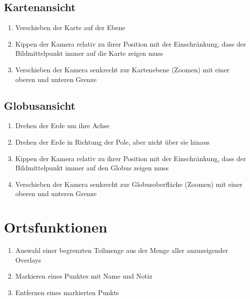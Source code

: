 \documentclass[10pt]{scrreprt}
\newcommand{\ziel}[1]{{\fontsize{9.5}{11}\textsf{/#1/}}}
\newcommand{\ziellabel}{Z}
\newcommand{\muss}{\renewcommand{\labelenumi}{\textbf{\ziel{\ziellabel\numprint{\theenumi}0}}}}
\newcommand{\wunsch}{\renewcommand{\labelenumi}{\textbf{\ziel{\ziellabel\numprint{\theenumi}0W}}}}
\begin{document}
\subsection*{Kartenansicht}
\begin{enumerate}[leftmargin=2.2cm,resume]
\item Verschieben der Karte auf der Ebene
\item Kippen der Kamera relativ zu ihrer Position mit der Einschränkung, dass der Bildmittelpunkt immer auf die Karte zeigen muss
\item Verschieben der Kamera senkrecht zur Kartenebene (Zoomen) mit einer oberen und unteren Grenze
\end{enumerate}

\subsection*{Globusansicht}
\begin{enumerate}[leftmargin=2.2cm,resume]
\item Drehen der Erde um ihre Achse
\item Drehen der Erde in Richtung der Pole, aber nicht über sie hinaus
\item Kippen der Kamera relativ zu ihrer Position mit der Einschränkung, dass der Bildmittelpunkt immer auf den Globus zeigen muss
\item Verschieben der Kamera senkrecht zur Globusoberfläche (Zoomen) mit einer oberen und unteren Grenze
\end{enumerate}

\section{Ortsfunktionen}
\begin{enumerate}[leftmargin=2.2cm,resume]
\item Auswahl einer begrenzten Teilmenge aus der Menge aller anzuzeigender Overlays
\wunsch
\item Markieren eines Punktes mit Name und Notiz
\item Entfernen eines markierten Punkts
\muss
\end{enumerate}
\end{document}

